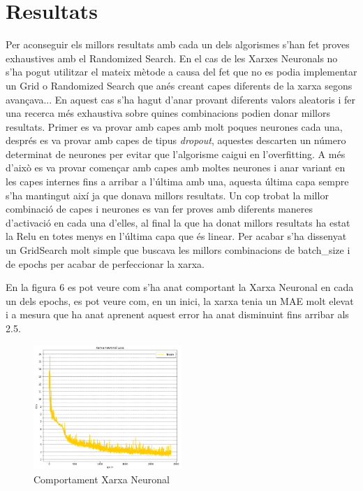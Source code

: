 \documentclass[10pt,a4paper,twocolumn,twoside]{article}
\begin{document}
\section{Resultats}
Per aconseguir els millors resultats amb cada un dels algorismes s'han fet proves exhaustives amb el Randomized Search. En el cas de les Xarxes Neuronals no s'ha pogut utilitzar el mateix mètode a causa del fet que no es podia implementar un Grid o Randomized Search que anés creant capes diferents de la xarxa segons avançava... En aquest cas s'ha hagut d'anar provant diferents valors aleatoris i fer una recerca més exhaustiva sobre quines combinacions podien donar millors resultats. Primer es va provar amb capes amb molt poques neurones cada una, després es va provar amb capes de tipus \textit{dropout}, aquestes descarten un número determinat de neurones per evitar que l'algorisme caigui en l'overfitting. A més d'això es va provar començar amb capes amb moltes neurones i anar variant en les capes internes fins a arribar a l'última amb una, aquesta última capa sempre s'ha mantingut així ja que donava millors resultats. Un cop trobat la millor combinació de capes i neurones es van fer proves amb diferents maneres d'activació en cada una d'elles, al final la que ha donat millors resultats ha estat la Relu en totes menys en l'última capa que és linear. Per acabar s'ha dissenyat un GridSearch molt simple que buscava les millors combinacions de batch\_size i de epochs per acabar de perfeccionar la xarxa. 

En la figura 6 es pot veure com s'ha anat comportant la Xarxa Neuronal en cada un dels epochs, es pot veure com, en un inici, la xarxa tenia un MAE molt elevat i a mesura que ha anat aprenent aquest error ha anat disminuint fins arribar als 2.5.
\begin{figure}[!h]
\centering
	\includegraphics[width=0.5\textwidth]{../img/analisiNN}
	\caption{Comportament Xarxa Neuronal}
	\label{fig-analisiNN}
\end{figure}
\end{document}
